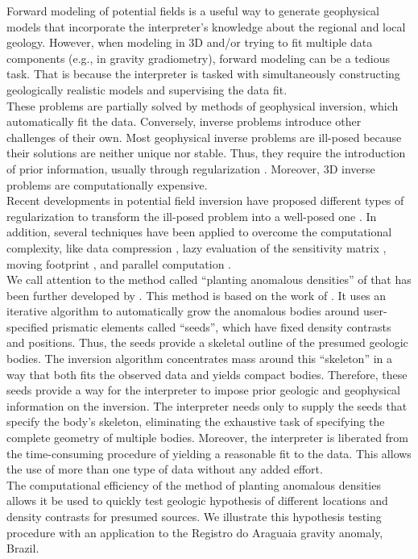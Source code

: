 \documentclass[twocolumn,final]{svjour3}
\begin{document}
\begin{sloppypar}
Forward modeling of potential fields
is a useful way to generate geophysical models
that incorporate the interpreter's knowledge
about the regional and local geology.
However,
when modeling in 3D
and/or trying to fit multiple data components
(e.g., in gravity gradiometry),
forward modeling can be a tedious task.
That is because the interpreter is
tasked with simultaneously
constructing geologically realistic models
and supervising the data fit.
\\\indent
These problems are partially solved
by methods of geophysical inversion,
which automatically fit the data.
Conversely,
inverse problems introduce other challenges of their own.
Most geophysical inverse problems are ill-posed
because their solutions are neither unique nor stable.
Thus, they require the introduction of prior information,
usually through regularization \citep{silva_potinversion}.
Moreover, 3D inverse problems are computationally expensive.
\\\indent
Recent developments in potential field inversion
have proposed different types of regularization
to transform the ill-posed problem into a well-posed one
\citep[e.g.,][]{last_kubik, li_oldenburg, zhdanov_focusing, silva_interactive,
silvadias_adaptive, martins_tv}.
In addition,
several techniques have been applied
to overcome the computational complexity,
like data compression \citep{zhdanov_compression, li_compression},
lazy evaluation of the sensitivity matrix \citep{uieda_planting},
moving footprint \citep{cox_footprint},
and parallel computation \citep{cuma_largescale}.
\\\indent
We call attention
to the method called ``planting anomalous densities''
of \citet{uieda_planting}
that has been further developed by \citet{uieda_shape}.
This method is based on
the work of \citet{rene}.
It uses an iterative algorithm
to automatically grow the anomalous bodies
around user-specified prismatic elements called ``seeds'',
which have fixed density contrasts and positions.
Thus, the seeds provide
a skeletal outline of the presumed geologic bodies.
The inversion algorithm concentrates mass
around this ``skeleton''
in a way that both
fits the observed data
and yields compact bodies.
Therefore,
these seeds provide
a way for the interpreter
to impose prior geologic and geophysical information
on the inversion.
The interpreter needs only to supply the seeds
that specify the body's skeleton,
eliminating the exhaustive task
of specifying the complete geometry
of multiple bodies.
Moreover,
the interpreter is liberated
from the time-consuming procedure
of yielding a reasonable fit to the data.
This allows the use
of more than one type of data
without any added effort.
\\\indent
The computational efficiency
of the method of planting anomalous densities
allows it be used to quickly test geologic hypothesis
of different locations and density contrasts
for presumed sources.
We illustrate this hypothesis testing procedure
with an application
to the Registro do Araguaia gravity anomaly, Brazil.
\end{sloppypar}
\end{document}
